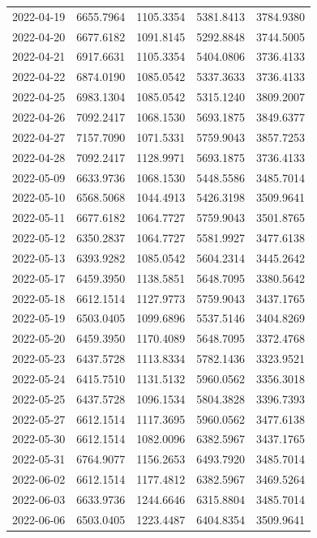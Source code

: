\begin{footnotesize}
\begin{longtable}{lllll}
2022-04-19 & 6655.7964 & 1105.3354 & 5381.8413 & 3784.9380 \\
2022-04-20 & 6677.6182 & 1091.8145 & 5292.8848 & 3744.5005 \\
2022-04-21 & 6917.6631 & 1105.3354 & 5404.0806 & 3736.4133 \\
2022-04-22 & 6874.0190 & 1085.0542 & 5337.3633 & 3736.4133 \\
2022-04-25 & 6983.1304 & 1085.0542 & 5315.1240 & 3809.2007 \\
2022-04-26 & 7092.2417 & 1068.1530 & 5693.1875 & 3849.6377 \\
2022-04-27 & 7157.7090 & 1071.5331 & 5759.9043 & 3857.7253 \\
2022-04-28 & 7092.2417 & 1128.9971 & 5693.1875 & 3736.4133 \\
2022-05-09 & 6633.9736 & 1068.1530 & 5448.5586 & 3485.7014 \\
2022-05-10 & 6568.5068 & 1044.4913 & 5426.3198 & 3509.9641 \\
2022-05-11 & 6677.6182 & 1064.7727 & 5759.9043 & 3501.8765 \\
2022-05-12 & 6350.2837 & 1064.7727 & 5581.9927 & 3477.6138 \\
2022-05-13 & 6393.9282 & 1085.0542 & 5604.2314 & 3445.2642 \\
2022-05-17 & 6459.3950 & 1138.5851 & 5648.7095 & 3380.5642 \\
2022-05-18 & 6612.1514 & 1127.9773 & 5759.9043 & 3437.1765 \\
2022-05-19 & 6503.0405 & 1099.6896 & 5537.5146 & 3404.8269 \\
2022-05-20 & 6459.3950 & 1170.4089 & 5648.7095 & 3372.4768 \\
2022-05-23 & 6437.5728 & 1113.8334 & 5782.1436 & 3323.9521 \\
2022-05-24 & 6415.7510 & 1131.5132 & 5960.0562 & 3356.3018 \\
2022-05-25 & 6437.5728 & 1096.1534 & 5804.3828 & 3396.7393 \\
2022-05-27 & 6612.1514 & 1117.3695 & 5960.0562 & 3477.6138 \\
2022-05-30 & 6612.1514 & 1082.0096 & 6382.5967 & 3437.1765 \\
2022-05-31 & 6764.9077 & 1156.2653 & 6493.7920 & 3485.7014 \\
2022-06-02 & 6612.1514 & 1177.4812 & 6382.5967 & 3469.5264 \\
2022-06-03 & 6633.9736 & 1244.6646 & 6315.8804 & 3485.7014 \\
2022-06-06 & 6503.0405 & 1223.4487 & 6404.8354 & 3509.9641 \\

\end{longtable}
\end{footnotesize}
